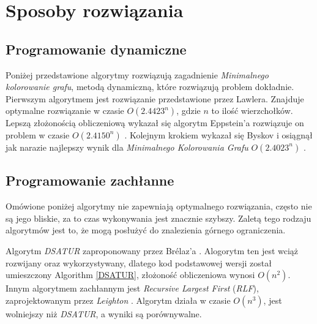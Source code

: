 \chapter{Sposoby rozwiązania}
\thispagestyle{chapterBeginStyle}
\label{rozdzial2}
\iffalse
\section{Dokładne rozwiązanie}
\fi

\section{Programowanie dynamiczne}
Poniżej przedstawione algorytmy rozwiązują zagadnienie \textit{Minimalnego kolorowanie grafu},
metodą dynamiczną, które rozwiązują problem dokładnie. Pierwszym algorytmem jest rozwiązanie przedstawione przez 
Lawlera. Znajduje optymalne rozwiązanie w czasie $O(2.4423^n)$, gdzie $n$ to ilość wierzchołków\cite{LAWLER197666}.
Lepszą złożonością obliczeniową wykazał się algorytm Eppstein'a rozwiązuje on problem w czasie $O(2.4150^n)$ \cite{Epp-JGAA-03}.
Kolejnym krokiem wykazał się Byskov i osiągnął jak narazie najlepszy wynik dla \textit{Minimalnego Kolorowania Grafu} $O(2.4023^n)$ \cite{byskov2002chromatic}.


\section{Programowanie zachłanne}
Omówione poniżej algorytmy nie zapewniają optymalnego rozwiązania, często nie są jego bliskie, za to czas wykonywania jest znacznie szybszy.
Zaletą tego rodzaju algorytmów jest to, że mogą posłużyć do znalezienia górnego ograniczenia.

Algorytm \textit{DSATUR} zaproponowany przez Brélaz'a \cite{Brelaz}.
Alogorytm ten jest wciąż rozwijany oraz wykorzystywany, dlatego kod podstawowej wersji został umieszczony Algorithm \ref{DSATUR}, złożoność obliczeniowa wynosi $O(n^2)$.
Innym algorytmem zachłannym jest \textit{Recursive Largest First} (\textit{RLF}), zaprojektowanym przez \textit{Leighton} \cite{Lewis}. 
Algorytm działa w czasie $O(n^3)$, jest wolniejszy niż \textit{DSATUR}, a wyniki są porównywalne. 

